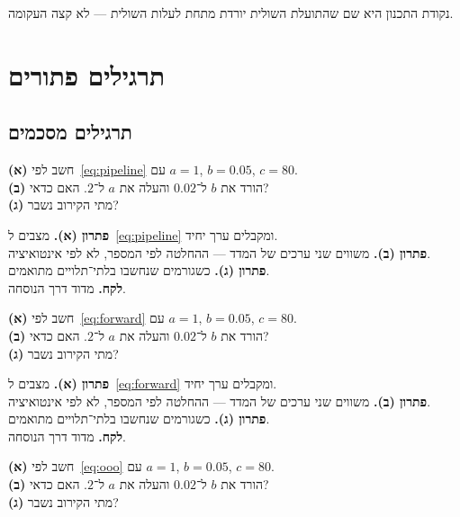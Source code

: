 נקודת התכנון היא שם שהתועלת השולית יורדת מתחת לעלות השולית — לא קצה העקומה.

\part{תרגילים פתורים}
\chapter{תרגילים מסכמים}
\label{ch:ex}


\begin{exbox}[frametitle={תרגיל 1 — \en{CPI}}]
\textbf{(א)} חשב לפי~\eqref{eq:pipeline} עם $a=1$, $b=0.05$, $c=80$.\\[3pt]
\textbf{(ב)} הורד את $b$ ל־$0.02$ והעלה את $a$ ל־$2$. האם כדאי?\\[3pt]
\textbf{(ג)} מתי הקירוב נשבר?
\end{exbox}

\begin{keybox}[frametitle={פתרון 1},nobreak=true]
\textbf{פתרון (א).} מצבים ל~\eqref{eq:pipeline} ומקבלים ערך יחיד.\\[2pt]
\textbf{פתרון (ב).} משווים שני ערכים של המדד — ההחלטה לפי המספר, לא לפי אינטואיציה.\\[2pt]
\textbf{פתרון (ג).} כשגורמים שנחשבו בלתי־תלויים מתואמים.\\[2pt]
\textbf{לקח.} מדוד דרך הנוסחה.
\end{keybox}


\begin{exbox}[frametitle={תרגיל 2 — \en{bypass}}]
\textbf{(א)} חשב לפי~\eqref{eq:forward} עם $a=1$, $b=0.05$, $c=80$.\\[3pt]
\textbf{(ב)} הורד את $b$ ל־$0.02$ והעלה את $a$ ל־$2$. האם כדאי?\\[3pt]
\textbf{(ג)} מתי הקירוב נשבר?
\end{exbox}

\begin{keybox}[frametitle={פתרון 2},nobreak=true]
\textbf{פתרון (א).} מצבים ל~\eqref{eq:forward} ומקבלים ערך יחיד.\\[2pt]
\textbf{פתרון (ב).} משווים שני ערכים של המדד — ההחלטה לפי המספר, לא לפי אינטואיציה.\\[2pt]
\textbf{פתרון (ג).} כשגורמים שנחשבו בלתי־תלויים מתואמים.\\[2pt]
\textbf{לקח.} מדוד דרך הנוסחה.
\end{keybox}


\begin{exbox}[frametitle={תרגיל 3 — \en{ROB}}]
\textbf{(א)} חשב לפי~\eqref{eq:ooo} עם $a=1$, $b=0.05$, $c=80$.\\[3pt]
\textbf{(ב)} הורד את $b$ ל־$0.02$ והעלה את $a$ ל־$2$. האם כדאי?\\[3pt]
\textbf{(ג)} מתי הקירוב נשבר?
\end{exbox}

